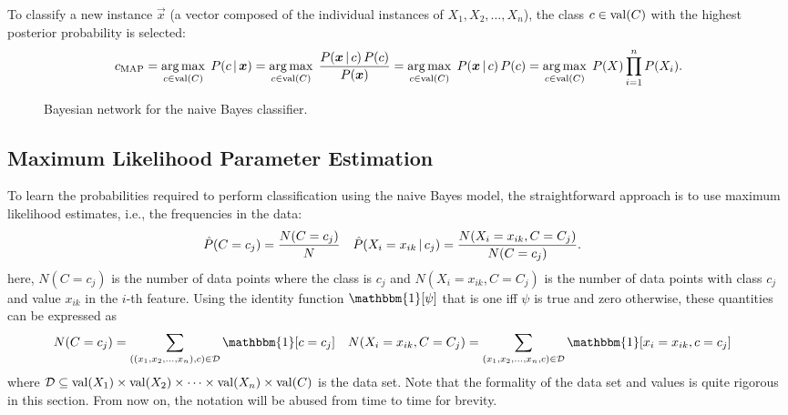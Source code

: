 		To classify a new instance \(\vec{x}\) (a vector composed of the individual instances of \(X_1, X_2, \dots, X_n\)), the class \(c \in \operatorname{val}(C)\) with the highest posterior probability is selected:
		\begin{equation}
			c_\mathrm{MAP}
				= \operatorname*{arg\,max}_{c \in \operatorname{val}(C)} \; P(c \,\vert\, \bm{x})
				= \operatorname*{arg\,max}_{c \in \operatorname{val}(C)} \; \frac{P(\bm{x} \,\vert\, c) \, P(c)}{P(\bm{x})}
				= \operatorname*{arg\,max}_{c \in \operatorname{val}(C)} \; P(\bm{x} \,\vert\, c) \, P(c)
				= \operatorname*{arg\,max}_{c \in \operatorname{val}(C)} \; P(X) \prod_{i = 1}^{n} P(X_i).
		\end{equation}

		\begin{figure}
			\centering
			\caption[Naive Bayes Bayesian Network]{Bayesian network for the naive Bayes classifier.}
			\label{fig:naiveBayes}
		\end{figure}

		\subsection{Maximum Likelihood Parameter Estimation}
			To learn the probabilities required to perform classification using the naive Bayes model, the straightforward approach is to use maximum likelihood estimates, i.e., the frequencies in the data:
			\begin{align}
				\hat{P}(C = c_j) &= \frac{N(C = c_j)}{N} &
				\hat{P}(X_i = x_{ik} \,\vert\, c_j) &= \frac{N(X_i = x_{ik}, C = C_j)}{N(C = c_j)}.
			\end{align}
			here, \( N(C = c_j) \) is the number of data points where the class is \(c_j\) and \( N(X_i = x_{ik}, C = C_j) \) is the number of data points with class \( c_j \) and value \(x_{ik}\) in the \(i\)-th feature. Using the identity function \(\mathbbm{1}[\psi]\) that is one iff \(\psi\) is true and zero otherwise, these quantities can be expressed as
			\begin{align}
				N(C = c_j) &= \sum_{((x_1, x_2, \dots, x_n), c) \in \mathcal{D}} \mathbbm{1}[c = c_j] &
				N(X_i = x_{ik}, C = C_j) &= \sum_{(x_1, x_2, \dots, x_n, c) \in \mathcal{D}} \mathbbm{1}[x_i = x_{ik}, c = c_j]
			\end{align}
			where \( \mathcal{D} \subseteq \operatorname{val}(X_1) \times \operatorname{val}(X_2) \times \dots \times \operatorname{val}(X_n) \times \operatorname{val}(C) \) is the data set. Note that the formality of the data set and values is quite rigorous in this section. From now on, the notation will be abused from time to time for brevity.

